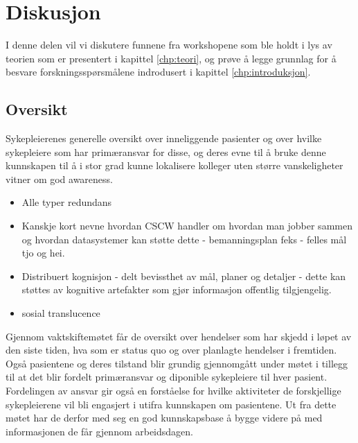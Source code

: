 \chapter{Diskusjon}
\label{chp:diskusjon}
I denne delen vil vi diskutere funnene fra workshopene som ble holdt i lys av teorien som er presentert i kapittel \ref{chp:teori}, og prøve å legge grunnlag for å besvare forskningsspørsmålene indrodusert i kapittel \ref{chp:introduksjon}.

\noindent
\section{Oversikt}
Sykepleierenes generelle oversikt over inneliggende pasienter og over hvilke sykepleiere som har primæransvar for disse, og deres evne til å bruke denne kunnskapen til å i stor grad kunne lokalisere kolleger uten større vanskeligheter vitner om god awareness. 

\noindent
\begin{itemize}
\item Alle typer redundans
\item Kanskje kort nevne hvordan CSCW  handler om hvordan man jobber sammen og hvordan datasystemer kan støtte dette - bemanningsplan feks - felles mål tjo og hei.
\item Distribuert kognisjon - delt bevissthet av mål, planer og detaljer - dette kan støttes av kognitive artefakter som gjør informasjon offentlig tilgjengelig.
\item sosial translucence
\end{itemize}





Gjennom vaktskiftemøtet får de oversikt over hendelser som har skjedd i løpet av den siste tiden, hva som er status quo og over planlagte hendelser i fremtiden. Også pasientene og deres tilstand blir grundig gjennomgått under møtet i tillegg til at det blir fordelt primæransvar og diponible sykepleiere til hver pasient. Fordelingen av ansvar gir også en forståelse for hvilke aktiviteter de forskjellige sykepleierene vil bli engasjert i utifra kunnskapen om pasientene. Ut fra dette møtet har de derfor med seg en god kunnskapsbase å bygge videre på med informasjonen de får gjennom arbeidsdagen. 

